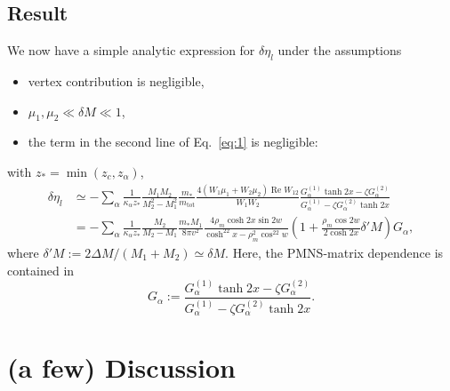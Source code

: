 \documentclass[a4paper,11pt,captions=tableheading,DIV=12]{scrartcl}
\numberwithin{equation}{section}
\renewcommand{\Re}{\mathop{\mathrm{Re}}}
\newcommand\mtot{m_{\mathrm{tot}}}
\begin{document}
\subsection{Result}
We now have a simple analytic expression for $\delta \eta_l$ under the assumptions
\begin{itemize}
 \item vertex contribution is negligible,
 \item $\mu_1, \mu_2 \ll \delta M \ll 1$,
 \item the term in the second line of Eq.~\ref{eq:1} is negligible:
\end{itemize}
with $z_*=\min(z_c,z_\alpha)$,
\begin{align}
  \delta \eta_l
&\simeq
-\sum_\alpha \frac1{\kappa_\alpha z_*}
\frac{M_1M_2}{M_2^2-M_1^2}
\frac{m_*}{\mtot}
\frac{4(W_1 \mu_1 + W_2 \mu_2)\Re W_{12}}{W_1W_2}
\frac{G_\alpha^{(1)}\tanh2x-\zeta G_\alpha^{(2)}}
{G_\alpha^{(1)}-\zeta G_\alpha^{(2)}\tanh2x}
\\&=
-\sum_\alpha \frac1{\kappa_\alpha z_*}
\frac{M_2}{M_2-M_1}
\frac{m_* M_1}{8\pi v^2}
\frac{4\rho_m\cosh2x\sin2w}{\cosh^22x-\rho_m^2\cos^22w}
\left(1+\frac{\rho_m\cos2w}{2\cosh2x}\delta'M\right)
G_\alpha,\label{eq:2}
\end{align}
where $\delta'M:=2\Delta M/(M_1+M_2)\simeq\delta M$.
Here, the PMNS-matrix dependence is contained in
\begin{equation}
 G_\alpha :=
\frac{G_\alpha^{(1)}\tanh2x-\zeta G_\alpha^{(2)}}
{G_\alpha^{(1)}-\zeta G_\alpha^{(2)}\tanh2x}.
\end{equation}



\section{(a few) Discussion}
\end{document}
